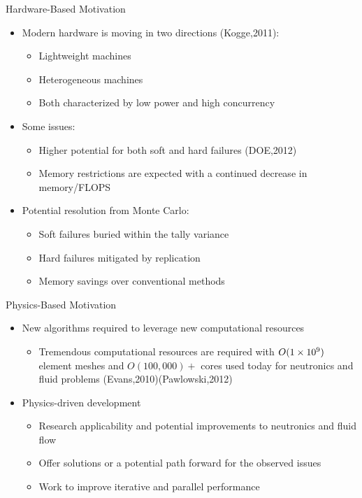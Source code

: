 \documentclass{beamer}
\begin{document}
\begin{frame}{Hardware-Based Motivation}

  \begin{itemize}
  \item Modern hardware is moving in two directions (Kogge,2011):
    \begin{itemize}
    \item Lightweight machines
    \item Heterogeneous machines
    \item Both characterized by low power and high concurrency
    \end{itemize}
    \medskip \medskip
  \item Some issues:
    \begin{itemize}
    \item Higher potential for both soft and hard failures (DOE,2012)
    \item Memory restrictions are expected with a continued decrease
      in memory/FLOPS
    \end{itemize}
    \medskip \medskip
  \item Potential resolution from Monte Carlo:
    \begin{itemize}
    \item Soft failures buried within the tally variance
    \item Hard failures mitigated by replication
    \item Memory savings over conventional methods
    \end{itemize}
  \end{itemize}

\end{frame}

\begin{frame}{Physics-Based Motivation}

  \begin{itemize}
  \item New algorithms required to leverage new computational
    resources
    \begin{itemize}
    \item Tremendous computational resources are required with
      $O(1\times 10^{9})$ element meshes and $O(100,000)+$ cores used today
      for neutronics and fluid problems (Evans,2010)(Pawlowski,2012)
    \end{itemize}
    \bigskip
    \bigskip
  \item Physics-driven development
    \begin{itemize}
    \item Research applicability and potential improvements to
      neutronics and fluid flow
    \item Offer solutions or a potential path forward for the observed
      issues
    \item Work to improve iterative and parallel performance
    \end{itemize}
  \end{itemize}

\end{frame}
\end{document}
